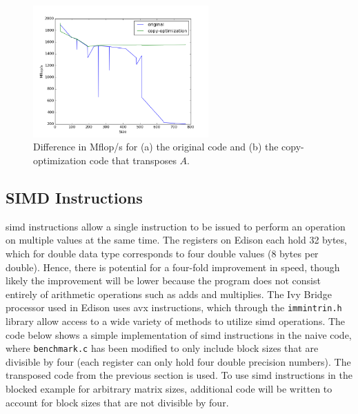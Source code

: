 \documentclass[10pt]{article}
\begin{document}
\begin{figure}[H]
\centering
\includegraphics[width=0.6\textwidth]{figures/copy-optimization.png}
\caption{Difference in Mflop/s for (a) the original code and (b) the copy-optimization code that transposes \(A\).}
\label{fig:2}
\end{figure}

\subsection{SIMD Instructions}
\label{sec:SIMDNaive}

\gls{simd} instructions allow a single instruction to be issued to perform an operation on multiple values at the same time. The registers on Edison each hold 32 bytes, which for double data type corresponds to four double values (8 bytes per double). Hence, there is potential for a four-fold improvement in speed, though likely the improvement will be lower because the program does not consist entirely of arithmetic operations such as adds and multiplies. The Ivy Bridge processor used in Edison uses \gls{avx} instructions, which through the {\tt immintrin.h} library allow access to a wide variety of methods to utilize \gls{simd} operations. The code below shows a simple implementation of \gls{simd} instructions in the naive code, where {\tt benchmark.c} has been modified to only include block sizes that are divisible by four (each register can only hold four double precision numbers). The transposed code from the previous section is used. To use \gls{simd} instructions in the blocked example for arbitrary matrix sizes, additional code will be written to account for block sizes that are not divisible by four.
\end{document}
